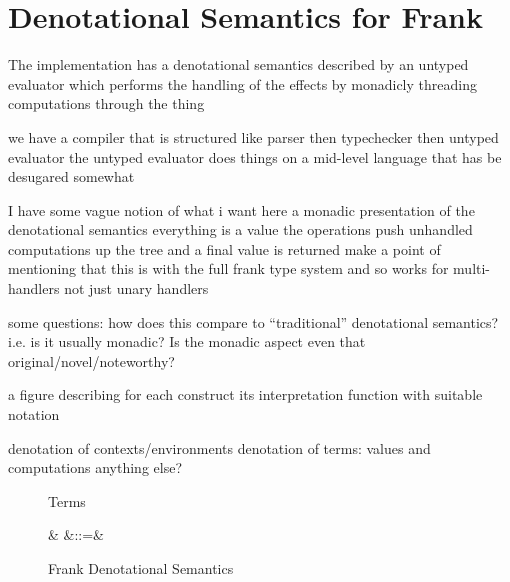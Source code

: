 \section{Denotational Semantics for Frank}
\label{sec:denote}

The implementation has a denotational semantics described by an untyped
evaluator which performs the handling of the effects by monadicly threading
computations through the thing

we have a compiler that is structured like parser then typechecker
then untyped evaluator the untyped evaluator does things on a
mid-level language that has be desugared somewhat

I have some vague notion of what i want here a monadic presentation of the
denotational semantics everything is a value the operations push unhandled
computations up the tree and a final value is returned make a point of
mentioning that this is with the full frank type system and so works for
multi-handlers not just unary handlers

some questions: how does this compare to ``traditional'' denotational
semantics? i.e. is it usually monadic? Is the monadic aspect even that
original/novel/noteworthy?

a figure describing for each construct its interpretation function with
suitable notation

denotation of contexts/environments
denotation of terms: values and computations
anything else?

\begin{figure}[float]
Terms
\begin{syntax}
&  &::=& ~
\end{syntax}

\caption{Frank Denotational Semantics}
\label{fig:frank-deno-sem}
\end{figure}

